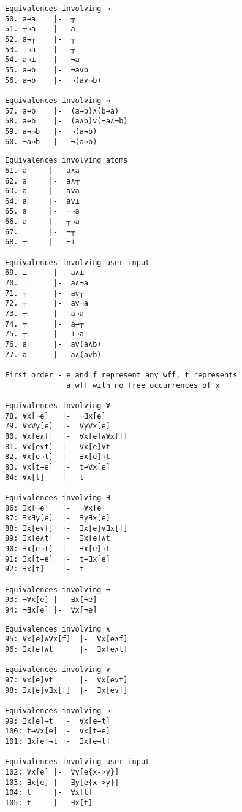 \documentclass{report}
\begin{document}
\begin{appendices}
\begin{listing}[ht]
\begin{verbatim}
Equivalences involving →
50. a→a    |-  ┬
51. ┬→a    |-  a
52. a→┬    |-  ┬
53. ⊥→a    |-  ┬
54. a→⊥    |-  ¬a
55. a→b    |-  ¬avb
56. a→b    |-  ¬(av¬b)

Equivalences involving ↔
57. a↔b    |-  (a→b)∧(b→a)
58. a↔b    |-  (a∧b)v(¬a∧¬b)
59. a↔¬b   |-  ¬(a↔b)
60. ¬a↔b   |-  ¬(a↔b)
\end{verbatim}
\end{listing}

\begin{listing}[ht]
\begin{verbatim}
Equivalences involving atoms
61. a     |-  a∧a
62. a     |-  a∧┬
63. a     |-  ava
64. a     |-  av⊥
65. a     |-  ¬¬a
66. a     |-  ┬→a
67. ⊥     |-  ¬┬
68. ┬     |-  ¬⊥

Equivalences involving user input
69. ⊥      |-  a∧⊥
70. ⊥      |-  a∧¬a
71. ┬      |-  av┬
72. ┬      |-  av¬a
73. ┬      |-  a→a 
74. ┬      |-  a→┬
75. ┬      |-  ⊥→a
76. a      |-  av(a∧b)
77. a      |-  a∧(avb)
 
First order - e and f represent any wff, t represents 
              a wff with no free occurrences of x 

Equivalences involving ∀
78. ∀x[¬e]   |-  ¬∃x[e] 
79. ∀x∀y[e]  |-  ∀y∀x[e]
80. ∀x[e∧f]  |-  ∀x[e]∧∀x[f]
81. ∀x[e∨t]  |-  ∀x[e]∨t
82. ∀x[e→t]  |-  ∃x[e]→t
83. ∀x[t→e]  |-  t→∀x[e]
84: ∀x[t]    |-  t

Equivalences involving ∃
86: ∃x[¬e]   |-  ¬∀x[e]
87: ∃x∃y[e]  |-  ∃y∃x[e]
88: ∃x[e∨f]  |-  ∃x[e]∨∃x[f]
89: ∃x[e∧t]  |-  ∃x[e]∧t
90: ∃x[e→t]  |-  ∃x[e]→t
91: ∃x[t→e]  |-  t→∃x[e]
92: ∃x[t]    |-  t

Equivalences involving ¬
93: ¬∀x[e] |-  ∃x[¬e]
94: ¬∃x[e] |-  ∀x[¬e]
\end{verbatim}
\end{listing}

\begin{listing}[ht]
\begin{verbatim}
Equivalences involving ∧
95: ∀x[e]∧∀x[f]  |-  ∀x[e∧f]
96: ∃x[e]∧t      |-  ∃x[e∧t]

Equivalences involving ∨
97: ∀x[e]∨t      |-  ∀x[e∨t]
98: ∃x[e]∨∃x[f]  |-  ∃x[e∨f]

Equivalences involving →
99: ∃x[e]→t  |-  ∀x[e→t]
100: t→∀x[e] |-  ∀x[t→e]
101: ∃x[e]→t |-  ∃x[e→t]

Equivalences involving user input
102: ∀x[e] |-  ∀y[e{x->y}]
103: ∃x[e] |-  ∃y[e{x->y}]
104: t     |-  ∀x[t]
105: t     |-  ∃x[t]
\end{verbatim}
\end{listing}

\end{appendices}
\end{document}

